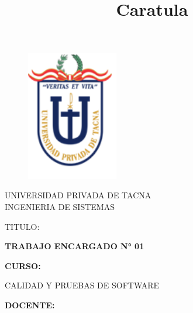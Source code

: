 \documentclass[12pt,letterpaper]{article}
\begin{document}
\title{Caratula}
\begin{titlepage}
\begin{figure}[htb]
\begin{center}
\includegraphics[width=4cm]{./Imagenes/logo.png}
\end{center}
\end{figure}
\vspace*{-0.25in}
\begin{center}
\large{UNIVERSIDAD PRIVADA DE TACNA}\\
\vspace*{-0.025in}
INGENIERIA DE SISTEMAS  \\

\vspace*{0.5in}
\begin{large}
TITULO:\\
\end{large}

\vspace*{0.1in}
\begin{Large}
\textbf{TRABAJO ENCARGADO N° 01} \\
\end{Large}

\vspace*{0.3in}
\begin{Large}
\textbf{CURSO:} \\
\end{Large}

\vspace*{0.1in}
\begin{large}
CALIDAD Y PRUEBAS DE SOFTWARE\\
\end{large}

\vspace*{0.3in}
\begin{Large}
\textbf{DOCENTE:} \\
\end{Large}


\end{center}
\end{titlepage}
\end{document}
